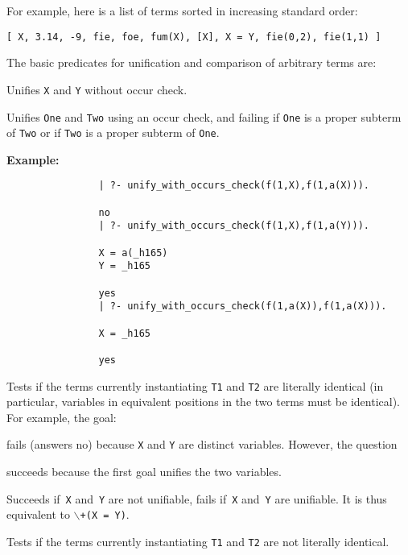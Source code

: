 For example, here is a list of terms sorted in increasing standard order:
\begin{center}
	{\tt [ X, 3.14, -9, fie, foe, fum(X), [X], X = Y, fie(0,2), fie(1,1) ]}
\end{center}
The basic predicates for unification and comparison of arbitrary terms are:
\begin{description}

    Unifies {\tt X} and {\tt Y} without occur check.

%
Unifies {\tt One} and {\tt Two} using an occur check, and failing if
{\tt One} is a proper subterm of {\tt Two} or if {\tt Two} is a proper
subterm of {\tt One}.  

{\bf Example:}
    {\footnotesize
     \begin{verbatim}
                | ?- unify_with_occurs_check(f(1,X),f(1,a(X))).

                no
                | ?- unify_with_occurs_check(f(1,X),f(1,a(Y))).

                X = a(_h165)
                Y = _h165

                yes
                | ?- unify_with_occurs_check(f(1,a(X)),f(1,a(X))).

                X = _h165

                yes
  \end{verbatim}}

    Tests if the terms currently instantiating {\tt T1} and {\tt T2}
    are literally identical (in particular, variables in equivalent positions
    in the two terms must be identical).
    For example, the goal:


    \noindent
    fails (answers no) because {\tt X} and {\tt Y} are distinct variables.
    However, the question


    \noindent
    succeeds because the first goal unifies the two variables.

    Succeeds if~{\tt X} and~{\tt Y} are not unifiable,
    fails if~{\tt X} and~{\tt Y} are unifiable.
    It is thus equivalent to {\tt $\backslash$+}\/{\tt (X = Y)}.

    Tests if the terms currently instantiating {\tt T1} and {\tt T2}
    are not literally identical.


\end{description}
